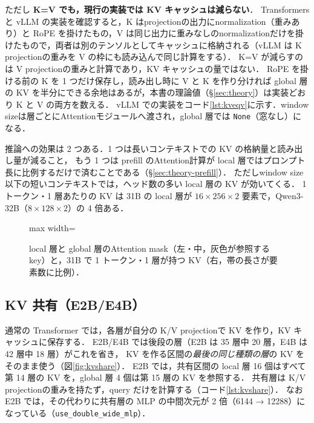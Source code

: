 \documentclass[a4paper,10pt]{ltjsarticle}
\begin{document}
ただし \textbf{K=V でも，現行の実装では KV キャッシュは減らない}．
Transformers と vLLM の実装を確認すると，K はprojectionの出力にnormalization（重みあり）と RoPE を掛けたもの，V は同じ出力に重みなしのnormalizationだけを掛けたもので，両者は別のテンソルとしてキャッシュに格納される（vLLM は K projectionの重みを V の枠にも読み込んで同じ計算をする）．
K=V が減らすのは V projectionの重みと計算であり，KV キャッシュの量ではない．
RoPE を掛ける前の K を 1 つだけ保存し，読み出し時に V と K を作り分ければ global 層の KV を半分にできる余地はあるが，本書の理論値（\S\ref{sec:theory}）は実装どおり K と V の両方を数える．
vLLM での実装をコード\ref{lst:kveqv}に示す．window sizeは層ごとにAttentionモジュールへ渡され，global 層では \texttt{None}（窓なし）になる．



推論への効果は 2 つある．1 つは長いコンテキストでの KV の格納量と読み出し量が減ること，
もう 1 つは prefill のAttention計算が local 層ではプロンプト長に比例するだけで済むことである（\S\ref{sec:theory-prefill}）．
ただしwindow size以下の短いコンテキストでは，ヘッド数の多い local 層の KV が効いてくる．
1 トークン・1 層あたりの KV は 31B の local 層が $16 \times 256 \times 2$ 要素で，Qwen3-32B（$8 \times 128 \times 2$）の 4 倍ある．

\begin{figure}[htbp]\centering
\begin{adjustbox}{max width=\linewidth}\end{adjustbox}
\caption{local 層と global 層のAttention mask（左・中，灰色が参照する key）と，31B で 1 トークン・1 層が持つ KV（右，帯の長さが要素数に比例）．}
\label{fig:attn}
\end{figure}

\subsection{KV 共有（E2B/E4B）}
通常の Transformer では，各層が自分の K/V projectionで KV を作り，KV キャッシュに保存する．
E2B/E4B では後段の層（E2B は 35 層中 20 層，E4B は 42 層中 18 層）がこれを省き，
KV を作る区間の\emph{最後の同じ種類の層}の KV をそのまま使う（図\ref{fig:kvshare}）．
E2B では，共有区間の local 層 16 個はすべて第 14 層の KV を，global 層 4 個は第 15 層の KV を参照する．
共有層は K/V projectionの重みを持たず，query だけを計算する（コード\ref{lst:kvshare}）．
なお E2B では，その代わりに共有層の MLP の中間次元が 2 倍（6144 → 12288）になっている（\texttt{use\_double\_wide\_mlp}）．
\end{document}
